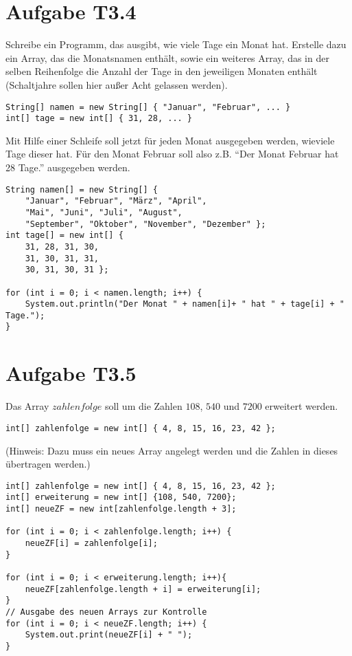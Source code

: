 \documentclass[final,a4paper]{article}
\begin{document}
\section*{Aufgabe T3.4}
Schreibe ein Programm, das ausgibt, wie viele Tage ein Monat hat. Erstelle dazu ein Array,
das die Monatsnamen enthält, sowie ein weiteres Array, das in der selben Reihenfolge die Anzahl
der Tage in den jeweiligen Monaten enthält (Schaltjahre sollen hier außer Acht gelassen werden).
\begin{lstlisting}
String[] namen = new String[] { "Januar", "Februar", ... }
int[] tage = new int[] { 31, 28, ... }
\end{lstlisting}
Mit Hilfe einer Schleife soll jetzt für jeden Monat ausgegeben werden, wieviele Tage dieser hat.
Für den Monat Februar soll also z.B. "`Der Monat Februar hat 28 Tage."' ausgegeben werden.

\begin{lstlisting}
String namen[] = new String[] {
	"Januar", "Februar", "März", "April",
	"Mai", "Juni", "Juli", "August",
	"September", "Oktober", "November", "Dezember" };
int tage[] = new int[] {
	31, 28, 31, 30,
	31, 30, 31, 31,
	30, 31, 30, 31 };

for (int i = 0; i < namen.length; i++) {
	System.out.println("Der Monat " + namen[i]+ " hat " + tage[i] + " Tage.");
}
\end{lstlisting}

\section*{Aufgabe T3.5}
Das Array $zahlenfolge$ soll um die Zahlen $108$, $540$ und $7200$ erweitert werden.
\begin{lstlisting}
int[] zahlenfolge = new int[] { 4, 8, 15, 16, 23, 42 };
\end{lstlisting}
(Hinweis: Dazu muss ein neues Array angelegt werden und die Zahlen in dieses übertragen werden.)

\begin{lstlisting}
int[] zahlenfolge = new int[] { 4, 8, 15, 16, 23, 42 };
int[] erweiterung = new int[] {108, 540, 7200};
int[] neueZF = new int[zahlenfolge.length + 3];

for (int i = 0; i < zahlenfolge.length; i++) {
	neueZF[i] = zahlenfolge[i];
}

for (int i = 0; i < erweiterung.length; i++){
	neueZF[zahlenfolge.length + i] = erweiterung[i];
}
// Ausgabe des neuen Arrays zur Kontrolle
for (int i = 0; i < neueZF.length; i++) {
	System.out.print(neueZF[i] + " ");
}
	\end{lstlisting}
\end{document}
